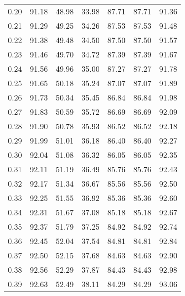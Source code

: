 \begin{tabular}{|c|c|c|c|c|c|c|}
      0.20 &     91.18 &     48.98 &      33.98 &   87.71 &      87.71 &         91.36 \\
      0.21 &     91.29 &     49.25 &      34.26 &   87.53 &      87.53 &         91.48 \\
      0.22 &     91.38 &     49.48 &      34.50 &   87.50 &      87.50 &         91.57 \\
      0.23 &     91.46 &     49.70 &      34.72 &   87.39 &      87.39 &         91.67 \\
      0.24 &     91.56 &     49.96 &      35.00 &   87.27 &      87.27 &         91.78 \\
      0.25 &     91.65 &     50.18 &      35.24 &   87.07 &      87.07 &         91.89 \\
      0.26 &     91.73 &     50.34 &      35.45 &   86.84 &      86.84 &         91.98 \\
      0.27 &     91.83 &     50.59 &      35.72 &   86.69 &      86.69 &         92.09 \\
      0.28 &     91.90 &     50.78 &      35.93 &   86.52 &      86.52 &         92.18 \\
      0.29 &     91.99 &     51.01 &      36.18 &   86.40 &      86.40 &         92.27 \\
      0.30 &     92.04 &     51.08 &      36.32 &   86.05 &      86.05 &         92.35 \\
      0.31 &     92.11 &     51.19 &      36.49 &   85.76 &      85.76 &         92.43 \\
      0.32 &     92.17 &     51.34 &      36.67 &   85.56 &      85.56 &         92.50 \\
      0.33 &     92.25 &     51.55 &      36.92 &   85.36 &      85.36 &         92.60 \\
      0.34 &     92.31 &     51.67 &      37.08 &   85.18 &      85.18 &         92.67 \\
      0.35 &     92.37 &     51.79 &      37.25 &   84.92 &      84.92 &         92.74 \\
      0.36 &     92.45 &     52.04 &      37.54 &   84.81 &      84.81 &         92.84 \\
      0.37 &     92.50 &     52.15 &      37.68 &   84.63 &      84.63 &         92.90 \\
      0.38 &     92.56 &     52.29 &      37.87 &   84.43 &      84.43 &         92.98 \\
      0.39 &     92.63 &     52.49 &      38.11 &   84.29 &      84.29 &         93.06 \\

\end{tabular}
